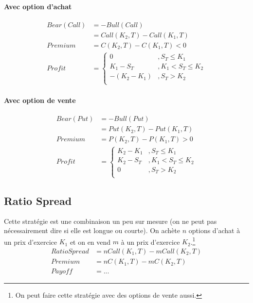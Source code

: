 \documentclass[10pt, french]{article}
\begin{document}
\begin{multicols*}{2}
\paragraph{Avec option d'achat}
\begin{align*}
Bear(Call) & =  - Bull(Call) \\
& = Call(K_2, T) - Call(K_1, T) \\
Premium		& = 	 C(K_2,T) - C(K_1,T) < 0 \\
Profit	& =
\begin{cases}
0					& , S_T \leq K_1 \\
K_1 - S_T 	& , K_1 < S_T \leq K_2 \\
-(K_2 - K_1)& , S_T > K_2 \\
\end{cases}
\end{align*}

\paragraph{Avec option de vente}
\begin{align*}
Bear(Put) 				& =  - Bull(Put) \\
								& = Put(K_2, T) - Put(K_1, T) \\
Premium					& = 	 P(K_2,T) - P(K_1,T) > 0 \\
Profit						& =
\begin{cases}
K_2 - K_1					& , S_T \leq K_1 \\
K_2 - S_T 				& , K_1 < S_T \leq K_2 \\
0								& , S_T > K_2 \\
\end{cases}
\end{align*}


\subsection*{Ratio Spread}
Cette stratégie est une combinaison un peu sur mesure (on ne peut pas nécessairement dire si elle est longue ou courte). On achète $n$ options d'achat à un prix d'exercice $K_1$ et on en vend $m$ à un prix d'exercice $K_2$.\footnote{On peut faire cette stratégie avec des options de vente aussi.}
\begin{align*}
Ratio Spread 		& 	= n Call(K_1, T) - m Call(K_2, T) \\
Premium				& = n C(K_1, T) - m C(K_2,T) \\
Payoff					& = ...
\end{align*}


\end{multicols*}
\end{document}
